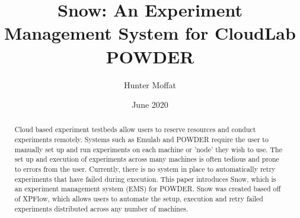 \documentclass[11pt,twocolumn,letterpaper]{article}
\title{Snow: An Experiment Management System for CloudLab POWDER}
\author{Hunter Moffat}
\date{June 2020}
\begin{document}
\maketitle

\begin{abstract}
Cloud based experiment testbeds allow users to reserve resources and conduct experiments remotely.  Systems such as Emulab and POWDER require the user to manually set up and run experiments on each machine or 'node' they wish to use.  The set up and execution of experiments across many machines is often tedious and prone to errors from the user.  Currently, there is no system in place to automatically retry experiments that have failed during execution.  This paper introduces Snow, which is an experiment management system (EMS) for POWDER. Snow was created based off of XPFlow, which allows users to automate the setup, execution and retry failed experiments distributed across any number of machines.    
\end{abstract}
\end{document}
